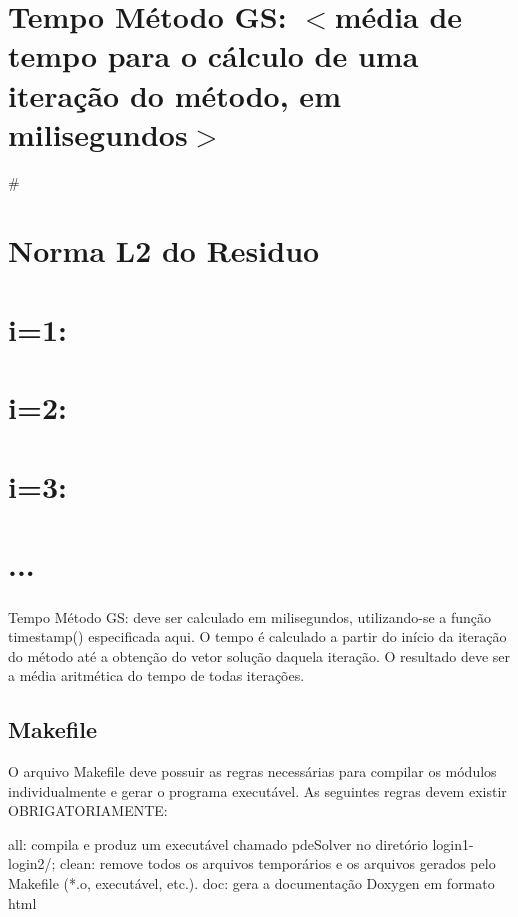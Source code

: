 \subparagraph*{}

\section*{Tempo Método GS\+: $<$média de tempo para o cálculo de uma iteração do método, em milisegundos$>$}

\# \section*{Norma L2 do Residuo}

\section*{i=1\+: }

\section*{i=2\+: }

\section*{i=3\+: }

\section*{...}

\subparagraph*{}

\begin{DoxyVerb}Tempo Método GS: deve ser calculado em milisegundos, utilizando-se a função timestamp() especificada aqui. O tempo é calculado a partir do início da iteração do método até a obtenção do vetor solução daquela iteração. O resultado deve ser a média aritmética do tempo de todas iterações.
\end{DoxyVerb}


\subsection*{Makefile}

O arquivo Makefile deve possuir as regras necessárias para compilar os módulos individualmente e gerar o programa executável. As seguintes regras devem existir O\+B\+R\+I\+G\+A\+T\+O\+R\+I\+A\+M\+E\+N\+TE\+: \begin{DoxyVerb}all: compila e produz um executável chamado pdeSolver no diretório login1-login2/;
clean: remove todos os arquivos temporários e os arquivos gerados pelo Makefile (*.o, executável, etc.).
doc: gera a documentação Doxygen em formato html\end{DoxyVerb}
 